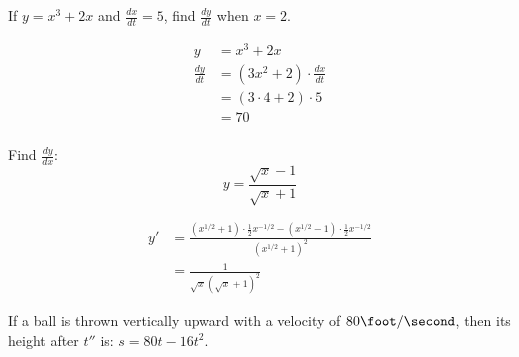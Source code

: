 \documentclass[fleqn,addpoints]{exam}
\begin{document}
\begin{questions}
\begin{solution}
\end{solution}

\question
If $y = x^3 + 2x$ and $\frac{dx}{dt} = 5$, find $\frac{dy}{dt}$ when $x = 2$.

\begin{solution}
\begin{align*}
  y &= x^3 + 2x \\
  \frac{dy}{dt} &= (3x^2 + 2) \cdot \frac{dx}{dt} \\
  &= (3 \cdot 4 + 2) \cdot 5 \\
  &= 70 \\
\end{align*}

\end{solution}

\ifprintanswers
\pagebreak
\fi

\question
Find $\frac{dy}{dx}$:
\[
  y = \frac{\sqrt{x} - 1}{\sqrt{x} + 1}
\]

\begin{solution}
\begin{align*}
  y' &= \frac{(x^{1/2} + 1) \cdot \frac{1}{2} x^{-1/2} - (x^{1/2} - 1) \cdot \frac{1}{2} x^{-1/2}}{(x^{1/2} + 1)^2} \\
  &= \frac{1}{\sqrt{x}(\sqrt{x} + 1)^2}
\end{align*}
  
\end{solution}

\question
If a ball is thrown vertically upward with a velocity of $80 \foot / \second$, then its height after $t \second$ is:
$s = 80t - 16t^2$.
\end{questions}
\end{document}
